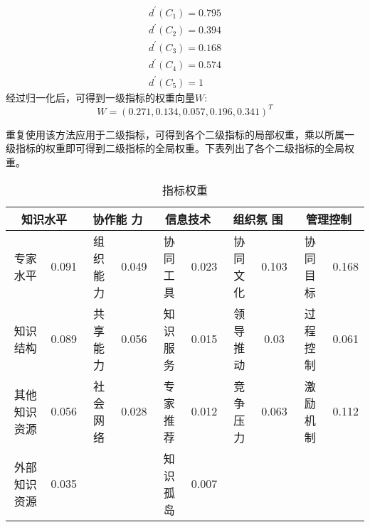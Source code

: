 \documentclass[winfonts,UTF8]{ctexart}
\begin{document}
\begin{eqnarray*}
  d^{'}(C_1)=0.795\\
  d^{'}(C_2)=0.394\\
  d^{'}(C_3)=0.168\\
  d^{'}(C_4)=0.574\\
  d^{'}(C_5)=1
\end{eqnarray*}
经过归一化后，可得到一级指标的权重向量$W$:
\[
W=(0.271,0.134,0.057,0.196,0.341)^T
\]

重复使用该方法应用于二级指标，可得到各个二级指标的局部权重，乘以所属一
级指标的权重即可得到二级指标的全局权重。下表列出了各个二级指标的全局权
重。
\begin{table}[htb]
  \centering
  \small
  \begin{tabular}{cccccccccc}
    \multicolumn{2}{c}{知识水平}&\multicolumn{2}{c}{协作能
      力}&\multicolumn{2}{c}{信息技术}&\multicolumn{2}{c}{组织氛
      围}&\multicolumn{2}{c}{管理控制}\\\hline
    专家水平&0.091&组织能力&0.049&协同工具&0.023&协同文化&0.103&协同目
    标&0.168\\
    知识结构&0.089&共享能力&0.056&知识服务&0.015&领导推动&0.03&过程控
    制&0.061\\
    其他知识资源&0.056&社会网络&0.028&专家推荐&0.012&竞争压力&0.063&激
    励机制&0.112\\
    外部知识资源&0.035&&&知识孤岛&0.007&&&& \\
  \end{tabular}
  \caption{指标权重}
\end{table}
\end{document}
